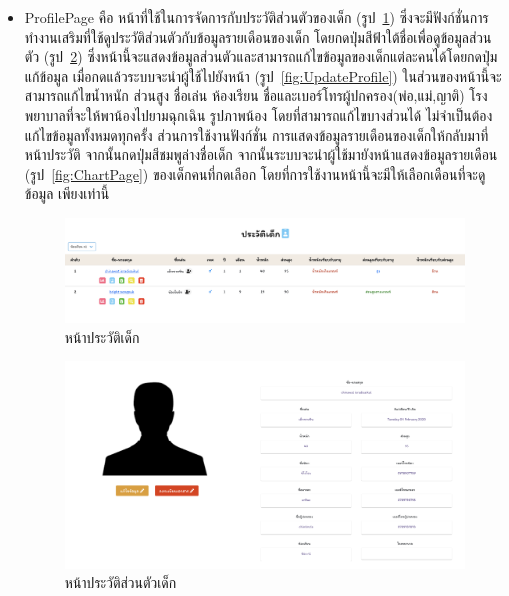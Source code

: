 \begin{itemize}
  
  \item  ProfilePage คือ หน้าที่ใช้ในการจัดการกับประวัติส่วนตัวของเด็ก (รูป~\ref{fig:Profile}) ซึ่งจะมีฟังก์ชั่นการทำงานเสริมที่ใช้ดูประวัติส่วนตัวกับข้อมูลรายเดือนของเด็ก
  โดยกดปุ่มสีฟ้าใต้ชื่อเพื่อดูข้อมูลส่วนตัว (รูป~\ref{fig:ProfileTwo}) ซึ่งหน้านี้จะแสดงข้อมูลส่วนตัวและสามารถแก้ไขข้อมูลของเด็กแต่ละคนได้โดยกดปุ่มแก้ข้อมูล เมื่อกดแล้วระบบจะนำผู้ใช้ไปยังหน้า (รูป~\ref{fig:UpdateProfile}) 
  ในส่วนของหน้านี้จะสามารถแก้ไขน้ำหนัก ส่วนสูง ชื่อเล่น ห้องเรียน ชื่อและเบอร์โทรผู้ปกครอง(พ่อ,แม่,ญาติ) โรงพยาบาลที่จะให้พาน้องไปยามฉุกเฉิน รูปภาพน้อง 
  โดยที่สามารถแก้ไขบางส่วนได้ ไม่จำเป็นต้องแก้ไขข้อมูลทั้งหมดทุกครั้ง ส่วนการใช้งานฟังก์ชั่น
  การแสดงข้อมูลรายเดือนของเด็กให้กลับมาที่หน้าประวัติ จากนั้นกดปุ่มสีชมพูล่างชื่อเด็ก
  จากนั้นระบบจะนำผู้ใช้มายังหน้าแสดงข้อมูลรายเดือน (รูป~\ref{fig:ChartPage}) ของเด็กคนที่กดเลือก โดยที่การใช้งานหน้านี้จะมีให้เลือกเดือนที่จะดูข้อมูล เพียงเท่านี้

  
    \begin{figure}
      \begin{center}
      \includegraphics[width=\linewidth]{images/Profile.png}
      \end{center}
      \caption[หน้าประวัติเด็ก]{หน้าประวัติเด็ก}
      \label{fig:Profile}
    \end{figure}
  
  
  
    \begin{figure}
      \begin{center}
      \includegraphics[width=\linewidth]{images/ProfileInfo.png}
      \end{center}
      \caption[หน้าประวัติส่วนตัวเด็ก]{หน้าประวัติส่วนตัวเด็ก}
      \label{fig:ProfileTwo}
    \end{figure}
  

\end{itemize}
